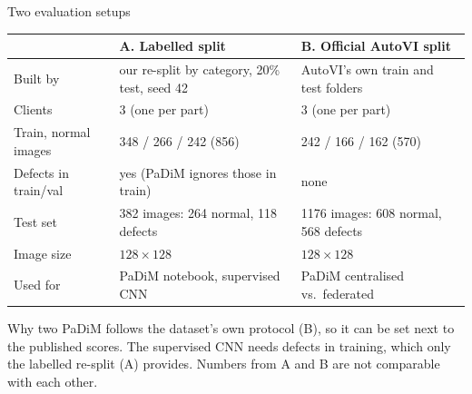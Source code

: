 \documentclass[aspectratio=169,10pt]{beamer}
\begin{document}
\begin{frame}{Two evaluation setups}
  \centering
  \small
  \begin{tabular}{p{2.6cm}p{5.3cm}p{5.3cm}}
    \toprule
     & \textbf{A. Labelled split} & \textbf{B. Official AutoVI split} \\
    \midrule
    Built by & our re-split by category, 20\% test, seed 42 & AutoVI's own train and test folders \\
    Clients & 3 (one per part) & 3 (one per part) \\
    Train, normal images & 348 / 266 / 242 (856) & 242 / 166 / 162 (570) \\
    Defects in train/val & yes (PaDiM ignores those in train) & none \\
    Test set & 382 images: 264 normal, 118 defects & 1176 images: 608 normal, 568 defects \\
    Image size & $128\times128$ & $128\times128$ \\
    Used for & PaDiM notebook, supervised CNN & PaDiM centralised vs.\ federated \\
    \bottomrule
  \end{tabular}
  \par\vspace{0.3cm}
  \begin{alertblock}{Why two}
    PaDiM follows the dataset's own protocol (B), so it can be set next to the
    published scores. The supervised CNN needs defects in training, which only the
    labelled re-split (A) provides. Numbers from A and B are not comparable with each other.
  \end{alertblock}
\end{frame}
\end{document}
